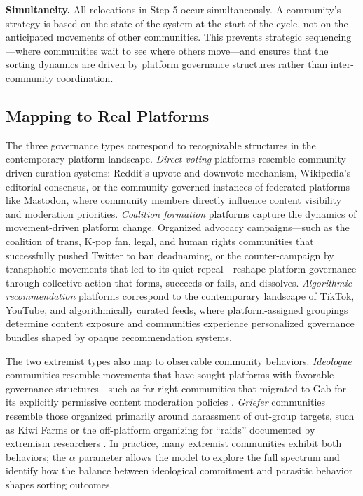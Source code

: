 \documentclass{article}
\begin{document}
\textbf{Simultaneity.} All relocations in Step 5 occur simultaneously. A community's strategy is based on the state of the system at the start of the cycle, not on the anticipated movements of other communities. This prevents strategic sequencing---where communities wait to see where others move---and ensures that the sorting dynamics are driven by platform governance structures rather than inter-community coordination.

\subsection{Mapping to Real Platforms}
\label{sec:mapping}

The three governance types correspond to recognizable structures in the contemporary platform landscape. \textit{Direct voting} platforms resemble community-driven curation systems: Reddit's upvote and downvote mechanism, Wikipedia's editorial consensus, or the community-governed instances of federated platforms like Mastodon, where community members directly influence content visibility and moderation priorities. \textit{Coalition formation} platforms capture the dynamics of movement-driven platform change. Organized advocacy campaigns---such as the coalition of trans, K-pop fan, legal, and human rights communities that successfully pushed Twitter to ban deadnaming, or the counter-campaign by transphobic movements that led to its quiet repeal---reshape platform governance through collective action that forms, succeeds or fails, and dissolves. \textit{Algorithmic recommendation} platforms correspond to the contemporary landscape of TikTok, YouTube, and algorithmically curated feeds, where platform-assigned groupings determine content exposure and communities experience personalized governance bundles shaped by opaque recommendation systems.

The two extremist types also map to observable community behaviors. \textit{Ideologue} communities resemble movements that have sought platforms with favorable governance structures---such as far-right communities that migrated to Gab for its explicitly permissive content moderation policies \citep{jasserWelcomeGabFamFarright2023, dehghanPoliticizationRadicalizationDiscourses2022}. \textit{Griefer} communities resemble those organized primarily around harassment of out-group targets, such as Kiwi Farms or the off-platform organizing for ``raids'' documented by extremism researchers \citep{lavin2020culture, gais2021encrypted}. In practice, many extremist communities exhibit both behaviors; the $\alpha$ parameter allows the model to explore the full spectrum and identify how the balance between ideological commitment and parasitic behavior shapes sorting outcomes.
\end{document}
